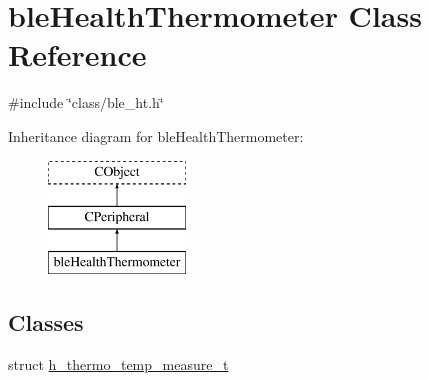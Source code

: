 \hypertarget{classble_health_thermometer}{\section{ble\-Health\-Thermometer Class Reference}
\label{classble_health_thermometer}
}


{\ttfamily \#include \char`\"{}class/ble\-\_\-ht.\-h\char`\"{}}

Inheritance diagram for ble\-Health\-Thermometer\-:\begin{figure}[H]
\begin{center}
\leavevmode
\includegraphics[height=3.000000cm]{d9/d26/classble_health_thermometer}
\end{center}
\end{figure}
\subsection*{Classes}
\begin{DoxyCompactItemize}
\item 
struct \hyperlink{structble_health_thermometer_1_1h__thermo__temp__measure__t}{h\-\_\-thermo\-\_\-temp\-\_\-measure\-\_\-t}
\end{DoxyCompactItemize}
